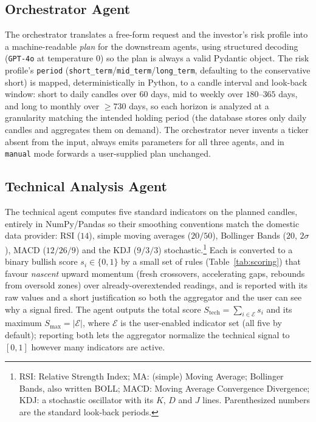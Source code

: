 \documentclass[runningheads]{llncs}
\begin{document}
\subsection{Orchestrator Agent}
\label{sec:orchestrator}

The orchestrator translates a free-form request and the investor's risk profile
into a machine-readable \emph{plan} for the downstream agents, using structured
decoding (\texttt{GPT-4o} at temperature $0$) so the plan is always a valid
Pydantic object. The risk profile's \texttt{period}
(\texttt{short\_term}/\texttt{mid\_term}/\texttt{long\_term}, defaulting to the
conservative \textsf{short}) is mapped, deterministically in Python, to a candle
interval and look-back window: \textsf{short} to daily candles over $60$ days,
\textsf{mid} to weekly over $180$--$365$ days, and \textsf{long} to monthly over
$\geq\!730$ days, so each horizon is analyzed at a granularity matching the
intended holding period (the database stores only daily candles and aggregates
them on demand). The orchestrator never invents a ticker absent from the input,
always emits parameters for all three agents, and in \texttt{manual} mode forwards
a user-supplied plan unchanged.

\subsection{Technical Analysis Agent}
\label{sec:technical}

The technical agent computes five standard indicators on the planned candles,
entirely in NumPy/Pandas so their smoothing conventions match the domestic data
provider: RSI ($14$), simple moving averages ($20/50$), Bollinger Bands
($20$, $2\sigma$), MACD ($12/26/9$) and the KDJ ($9/3/3$)
stochastic.\footnote{RSI: Relative Strength Index; MA: (simple) Moving Average;
Bollinger Bands, also written BOLL; MACD: Moving Average Convergence Divergence;
KDJ: a stochastic oscillator with its $K$, $D$ and $J$ lines. Parenthesized
numbers are the standard look-back periods.} Each is
converted to a binary bullish score $s_i\in\{0,1\}$ by a small set of rules
(Table~\ref{tab:scoring}) that favour \emph{nascent} upward momentum (fresh
crossovers, accelerating gaps, rebounds from oversold zones) over
already-overextended readings, and is reported with its raw values and a short
justification so both the aggregator and the user can see why a signal fired. The
agent outputs the total score $S_{\mathrm{tech}}=\sum_{i\in\mathcal{E}} s_i$ and
its maximum $S_{\max}=|\mathcal{E}|$, where $\mathcal{E}$ is the user-enabled
indicator set (all five by default); reporting both lets the aggregator normalize
the technical signal to $[0,1]$ however many indicators are active.
\end{document}
